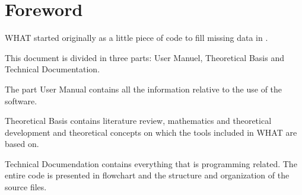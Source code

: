 \documentclass[WHATMANUAL.tex]{subfiles}
\begin{document}
\chapter*{Foreword}


WHAT started originally as a little piece of code to fill missing data in .

This document is divided in three parts: User Manuel, Theoretical Basis and Technical Documentation.

The part User Manual contains all the information relative to the use of the software.

Theoretical Basis contains literature review, mathematics and theoretical development and theoretical concepts on which the tools included in WHAT are based on.

Technical Documendation contains everything that is programming related. The entire code is presented in flowchart and the structure and organization of the source files.
\end{document}
